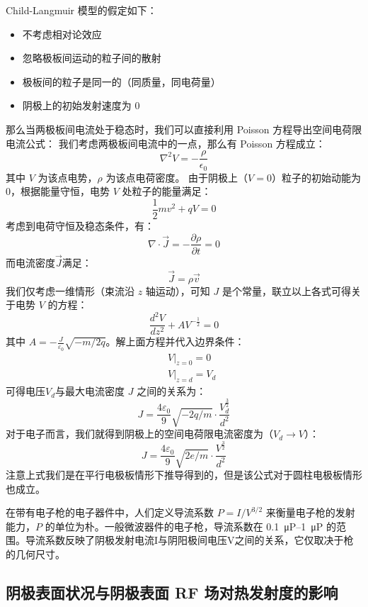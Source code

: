 	Child-Langmuir 模型的假定如下：
	\begin{itemize}
	\item 不考虑相对论效应
	\item 忽略极板间运动的粒子间的散射
	\item 极板间的粒子是同一的（同质量，同电荷量）
	\item 阴极上的初始发射速度为 0
	\end{itemize}
	那么当两极板间电流处于稳态时，我们可以直接利用 Poisson 方程导出空间电荷限电流公式：
	我们考虑两极板间电流中的一点，那么有 Poisson 方程成立：
	\[\nabla^2V=-\frac{\rho}{\epsilon_0}\]
	其中 $V$ 为该点电势，$\rho$ 为该点电荷密度。
	由于阴极上（$V=0$）粒子的初始动能为 0，根据能量守恒，电势 $V$ 处粒子的能量满足：
	\[\frac{1}{2}mv^2+qV=0\]
	考虑到电荷守恒及稳态条件，有：
	\[\nabla\cdot\vec{J}=-\frac{\partial \rho}{\partial t}= 0\]
	而电流密度$\vec{J}$满足：
	\[\vec{J}=\rho \vec{v}\]
	我们仅考虑一维情形（束流沿 $z$ 轴运动），可知 $J$ 是个常量，联立以上各式可得关于电势 $V$ 的方程：
	\[\frac{d^2V}{dz^2}+AV^{-\frac{1}{2}}=0\]
	其中 $A=-\frac{J}{\varepsilon_0}\sqrt{-m/2q}$。解上面方程并代入边界条件：
	\begin{eqnarray*}
	&&V|_{z=0}=0\\
	&&V|_{z=d}=V_d
	\end{eqnarray*}
	可得电压$V_d$与最大电流密度 $J$ 之间的关系为：
	\[J = \frac{4\varepsilon_0}{9}\sqrt{-2q/m}\cdot \frac{V_d^{\frac{3}{2}}}{d^2}\]
	对于电子而言，我们就得到阴极上的空间电荷限电流密度为（$V_d\rightarrow V$）：
	\begin{equation}
	J = \frac{4\varepsilon_0}{9}\sqrt{2e/m}\cdot \frac{V^{\frac{3}{2}}}{d^2}
	\end{equation}
	注意上式我们是在平行电极板情形下推导得到的，但是该公式对于圆柱电极板情形也成立。

	在带有电子枪的电子器件中，人们定义导流系数 $P=I/V^{3/2}$ 来衡量电子枪的发射能力，$P$ 的单位为朴。一般微波器件的电子枪，导流系数在 \SIrange[range-phrase = --]{0.1}{1}{\micro P} 的范围。导流系数反映了阴极发射电流I与阴阳极间电压V之间的关系，它仅取决于枪的几何尺寸。

\subsection{阴极表面状况与阴极表面 RF 场对热发射度的影响}

